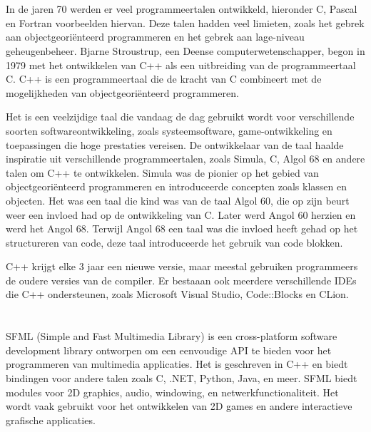 \section{}%
\label{sec:Wat is c++?}


In de jaren 70 werden er veel programmeertalen ontwikkeld, hieronder C, Pascal en Fortran voorbeelden hiervan.
Deze talen hadden veel limieten, zoals het gebrek aan objectgeoriënteerd programmeren en het gebrek aan lage-niveau geheugenbeheer.
Bjarne Stroustrup, een Deense computerwetenschapper, begon in 1979 met het ontwikkelen van C++ als een uitbreiding van de programmeertaal C.
C++ is een programmeertaal die de kracht van C combineert met de mogelijkheden van objectgeoriënteerd programmeren.


Het is een veelzijdige taal die vandaag de dag gebruikt wordt voor verschillende soorten softwareontwikkeling, zoals systeemsoftware, game-ontwikkeling en toepassingen die hoge prestaties vereisen.
De ontwikkelaar van de taal haalde inspiratie uit verschillende programmeertalen, zoals Simula, C, Algol 68 en andere talen om C++ te ontwikkelen.
Simula was de pionier op het gebied van objectgeoriënteerd programmeren en introduceerde concepten zoals klassen en objecten.
Het was een taal die kind was van de taal Algol 60, die op zijn beurt weer een invloed had op de ontwikkeling van C.
Later werd Angol 60 herzien en werd het Angol 68.
Terwijl Angol 68 een taal was die invloed heeft gehad op het structureren van code, deze taal introduceerde het gebruik van code blokken.


C++ krijgt elke 3 jaar een nieuwe versie, maar meestal gebruiken programmeers de oudere versies van de compiler.
Er bestaaan ook meerdere verschillende IDEs die C++ ondersteunen, 
zoals Microsoft Visual Studio, Code::Blocks en CLion.  

\section{}%
\label{sec:Wat is SFML?}

SFML (Simple and Fast Multimedia Library) is een cross-platform software development library ontworpen om een eenvoudige API te bieden voor het programmeren van multimedia applicaties. 
Het is geschreven in C++ en biedt bindingen voor andere talen zoals C, .NET, Python, Java, en meer.
SFML biedt modules voor 2D graphics, audio, windowing, en netwerkfunctionaliteit. 
Het wordt vaak gebruikt voor het ontwikkelen van 2D games en andere interactieve grafische applicaties.


